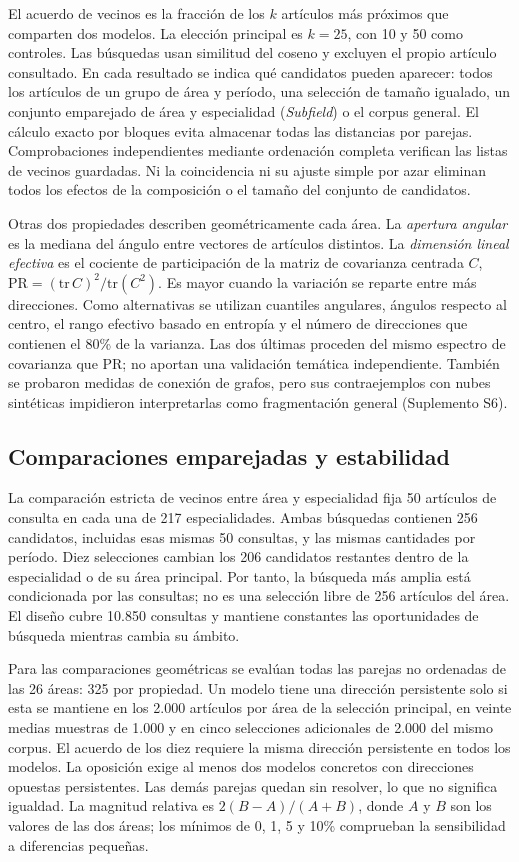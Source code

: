 \documentclass[12pt]{article}
\begin{document}
El acuerdo de vecinos es la fracción de los $k$ artículos más próximos que comparten dos modelos. La elección principal es $k=25$, con 10 y 50 como controles. Las búsquedas usan similitud del coseno y excluyen el propio artículo consultado. En cada resultado se indica qué candidatos pueden aparecer: todos los artículos de un grupo de área y período, una selección de tamaño igualado, un conjunto emparejado de área y especialidad (\emph{Subfield}) o el corpus general. El cálculo exacto por bloques evita almacenar todas las distancias por parejas. Comprobaciones independientes mediante ordenación completa verifican las listas de vecinos guardadas. Ni la coincidencia ni su ajuste simple por azar eliminan todos los efectos de la composición o el tamaño del conjunto de candidatos.

Otras dos propiedades describen geométricamente cada área. La \emph{apertura angular} es la mediana del ángulo entre vectores de artículos distintos. La \emph{dimensión lineal efectiva} es el cociente de participación de la matriz de covarianza centrada $C$, $\mathrm{PR}=(\mathrm{tr}\,C)^2/\mathrm{tr}(C^2)$. Es mayor cuando la variación se reparte entre más direcciones. Como alternativas se utilizan cuantiles angulares, ángulos respecto al centro, el rango efectivo basado en entropía y el número de direcciones que contienen el 80\% de la varianza. Las dos últimas proceden del mismo espectro de covarianza que PR; no aportan una validación temática independiente. También se probaron medidas de conexión de grafos, pero sus contraejemplos con nubes sintéticas impidieron interpretarlas como fragmentación general (Suplemento S6).

\subsection{Comparaciones emparejadas y estabilidad}
La comparación estricta de vecinos entre área y especialidad fija 50 artículos de consulta en cada una de 217 especialidades. Ambas búsquedas contienen 256 candidatos, incluidas esas mismas 50 consultas, y las mismas cantidades por período. Diez selecciones cambian los 206 candidatos restantes dentro de la especialidad o de su área principal. Por tanto, la búsqueda más amplia está condicionada por las consultas; no es una selección libre de 256 artículos del área. El diseño cubre 10.850 consultas y mantiene constantes las oportunidades de búsqueda mientras cambia su ámbito.

Para las comparaciones geométricas se evalúan todas las parejas no ordenadas de las 26 áreas: 325 por propiedad. Un modelo tiene una dirección persistente solo si esta se mantiene en los 2.000 artículos por área de la selección principal, en veinte medias muestras de 1.000 y en cinco selecciones adicionales de 2.000 del mismo corpus. El acuerdo de los diez requiere la misma dirección persistente en todos los modelos. La oposición exige al menos dos modelos concretos con direcciones opuestas persistentes. Las demás parejas quedan sin resolver, lo que no significa igualdad. La magnitud relativa es $2(B-A)/(A+B)$, donde $A$ y $B$ son los valores de las dos áreas; los mínimos de 0, 1, 5 y 10\% comprueban la sensibilidad a diferencias pequeñas.
\end{document}
